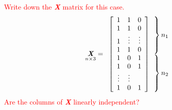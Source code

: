 \documentclass[12pt]{report}
\begin{document}
\noindent \textcolor{red}
{
	Write down the \textit{\textbf{X}} matrix for this case.
}
\begin{equation*}
\underset{n\times3}{\textit{\textbf{X}}} = \begin{array}{c@{\!\!\!}l}
\left[ \begin{array}[c]{ccccc}
1 & 1 & 0 \\
1 & 1 & 0 \\
1 & \vdots & \vdots \\
1 & 1 & 0 \\
1 & 0 & 1 \\
1 & 0 & 1 \\
\vdots & \vdots \\
1 & 0 & 1 \\
\end{array}  \right]
&
\begin{array}[c]{@{}l@{\,}l}
\left. \begin{array}{c} \vphantom{0} \\ \vphantom{0} \\\vphantom{\vdots}\\ \vphantom{0} \end{array} \right\} & \text{$n_1$} \\
\left. \begin{array}{c} \vphantom{1} \\ \vphantom{1} \\ \vphantom{\vdots}
\\ \vphantom{1}  \end{array} \right\} & \text{$n_2$} \\
\end{array}
\end{array}
\end{equation*}
\noindent \textcolor{red}
{
	Are the columns of \textit{\textbf{X}} linearly independent?
}
\end{document}
